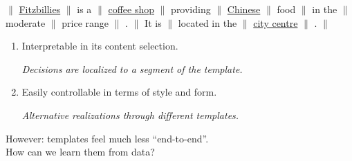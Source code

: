 \begin{frame}
$\|$ \underline{Fitzbillies} $\|$  \pause is a $\|$ \pause   \underline{coffee shop} $\|$ \pause  providing $\|$  \underline{Chinese} $\|$ food $\|$ in the $\|$  moderate $\|$ price range $\|$ . $\|$ It is  $\|$ located in the $\|$ \underline{city centre} $\|$ . $\|$





\end{frame}


\begin{frame}

\begin{enumerate}
\item Interpretable in its content selection.
  \air

  \textit{Decisions are localized to a segment of the template.}

  \air

\item Easily controllable in terms of style and form.
  \air

  \textit{Alternative realizations through different templates.}
\end{enumerate}


\air

\pause



\alert{However:} templates feel much less ``end-to-end''. \\
How can we learn them from data?

\end{frame}

